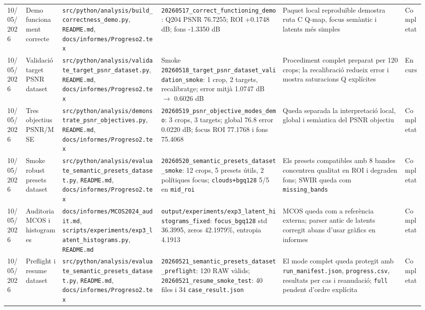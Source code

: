 \documentclass[11pt,a4paper]{article}
\begin{document}
\begin{longtable}{p{1.7cm} p{2.3cm} p{2.6cm} p{2.8cm} p{2.1cm} p{2.0cm}}
10/05/2026 & Demo funcionament correcte & \texttt{src/python/analysis/build\_correctness\_demo.py}, \texttt{README.md}, \texttt{docs/informes/Progreso2.tex} & \texttt{20260517\_correct\_functioning\_demo}: Q204 PSNR 76.7255; ROI +0.1748 dB; fons -1.3350 dB & Paquet local reproduïble demostra ruta C Q-map, focus semàntic i latents més simples & Completat \\
10/05/2026 & Validació target PSNR dataset & \texttt{src/python/analysis/validate\_target\_psnr\_dataset.py}, \texttt{README.md}, \texttt{docs/informes/Progreso2.tex} & Smoke \texttt{20260518\_target\_psnr\_dataset\_validation\_smoke}: 1 crop, 2 targets, recalibratge; error mitjà 1.0747 dB $\rightarrow$ 0.6026 dB & Procediment complet preparat per 120 crops; la recalibració redueix error i mostra saturacions Q explícites & En curs \\
10/05/2026 & Tres objectius PSNR/MSE & \texttt{src/python/analysis/demonstrate\_psnr\_objectives.py}, \texttt{README.md}, \texttt{docs/informes/Progreso2.tex} & \texttt{20260519\_psnr\_objective\_modes\_demo}: 3 crops, 3 targets; global 76.8 error 0.0220 dB; focus ROI 77.1768 i fons 75.4068 & Queda separada la interpretació local, global i semàntica del PSNR objectiu & Completat \\
10/05/2026 & Smoke robust presets dataset & \texttt{src/python/analysis/evaluate\_semantic\_presets\_dataset.py}, \texttt{README.md}, \texttt{docs/informes/Progreso2.tex} & \texttt{20260520\_semantic\_presets\_dataset\_smoke}: 12 crops, 5 presets útils, 2 polítiques focus; \texttt{clouds+bgq128} 5/5 en \texttt{mid\_roi} & Els presets compatibles amb 8 bandes concentren qualitat en ROI i degraden fons; SWIR queda com \texttt{missing\_bands} & Completat \\
10/05/2026 & Auditoria MCOS i histogrames & \texttt{docs/informes/MCOS2024\_audit.md}, \texttt{scripts/experiments/exp3\_latent\_histograms.py}, \texttt{README.md} & \texttt{output/experiments/exp3\_latent\_histograms\_fixed}: \texttt{focus\_bgq128} std 36.3995, zeros 42.1979\%, entropia 4.1913 & MCOS queda com a referència externa; parser antic de latents corregit abans d'usar gràfics en informes & Completat \\
10/05/2026 & Preflight i resume dataset & \texttt{src/python/analysis/evaluate\_semantic\_presets\_dataset.py}, \texttt{README.md}, \texttt{docs/informes/Progreso2.tex} & \texttt{20260521\_semantic\_presets\_dataset\_preflight}: 120 RAW vàlids; \texttt{20260521\_resume\_smoke\_test}: 40 files i 34 \texttt{case\_result.json} & El mode complet queda protegit amb \texttt{run\_manifest.json}, \texttt{progress.csv}, resultats per cas i reanudació; \texttt{full} pendent d'ordre explícita & Completat \\

\end{longtable}
\end{document}
